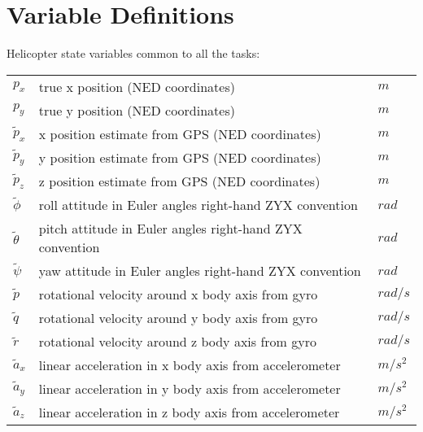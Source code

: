 \documentclass{article}
\begin{document}
\begin{small}

%
%
%
%
%


\end{small}

\newpage

\appendix

\section{Variable Definitions}\label{tab:naming}

Helicopter state variables common to all the tasks:
\begin{table}[h]  
\begin{tabular}{l l l}
     $p_x$ & true x position (NED coordinates)            & $m$\\
     $p_y$ & true y position (NED coordinates)            & $m$\\
     $\tilde{p}_x$ & x position estimate from GPS (NED coordinates)            & $m$\\
     $\tilde{p}_y$ & y position estimate from GPS (NED coordinates)            & $m$\\
     $\tilde{p}_z$ & z position estimate from GPS (NED coordinates)            & $m$\\
     $\tilde{\phi}$ & roll attitude in Euler angles right-hand ZYX convention & $rad$\\
     $\tilde{\theta}$ & pitch attitude in Euler angles right-hand ZYX convention& $rad$\\
     $\tilde{\psi}$ & yaw attitude in Euler angles right-hand ZYX convention  & $rad$\\
     $\tilde{p}$  & rotational velocity around x body axis from gyro                 & $rad/s$\\ 
     $\tilde{q}$  & rotational velocity around y body axis from gyro                 & $rad/s$\\ 
     $\tilde{r}$  & rotational velocity around z body axis from gyro                & $rad/s$\\
     $\tilde{a}_x$ & linear acceleration in x body axis from accelerometer            & $m/s^2$\\
     $\tilde{a}_y$ & linear acceleration in y body axis from accelerometer             & $m/s^2$\\
     $\tilde{a}_z$ & linear acceleration in z body axis from accelerometer             & $m/s^2$\\

\end{tabular}
\end{table}
\end{document}
